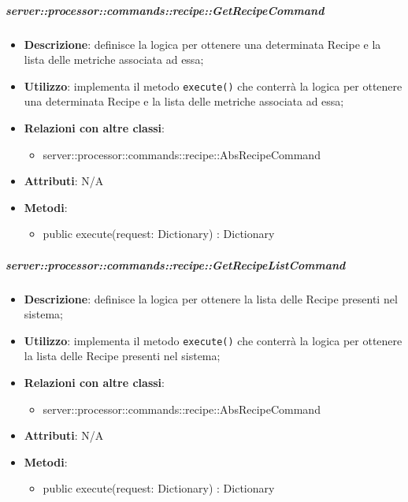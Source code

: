         \subparagraph{server::processor::commands::recipe::GetRecipeCommand} %
        \label{subp:bdsm_app_server_processor_commands_recipe_getrecipecommand}
        \begin{itemize}
          \item \textbf{Descrizione}: definisce la logica per ottenere una determinata Recipe e la lista delle metriche associata ad essa;
          \item \textbf{Utilizzo}: implementa il metodo \texttt{execute()} che conterrà la logica per ottenere una determinata Recipe e la lista delle metriche associata ad essa;
          \item \textbf{Relazioni con altre classi}:
            \begin{itemize}
              \item server::processor::commands::recipe::AbsRecipeCommand
            \end{itemize}
			\item \textbf{Attributi}: N/A
			\item \textbf{Metodi}:
        	\begin{itemize}
          		\item public execute(request: Dictionary) : Dictionary
        	\end{itemize}
        \end{itemize}

        \subparagraph{server::processor::commands::recipe::GetRecipeListCommand} %
        \label{subp:bdsm_app_server_processor_commands_recipe_getrecipelistcommand}
        \begin{itemize}
          \item \textbf{Descrizione}: definisce la logica per ottenere la lista delle Recipe presenti nel sistema;
          \item \textbf{Utilizzo}: implementa il metodo \texttt{execute()} che conterrà la logica per ottenere la lista delle Recipe presenti nel sistema;
          \item \textbf{Relazioni con altre classi}:
            \begin{itemize}
              \item server::processor::commands::recipe::AbsRecipeCommand
            \end{itemize}
			\item \textbf{Attributi}: N/A
			\item \textbf{Metodi}:
        	\begin{itemize}
          		\item public execute(request: Dictionary) : Dictionary
        	\end{itemize}
        \end{itemize}

